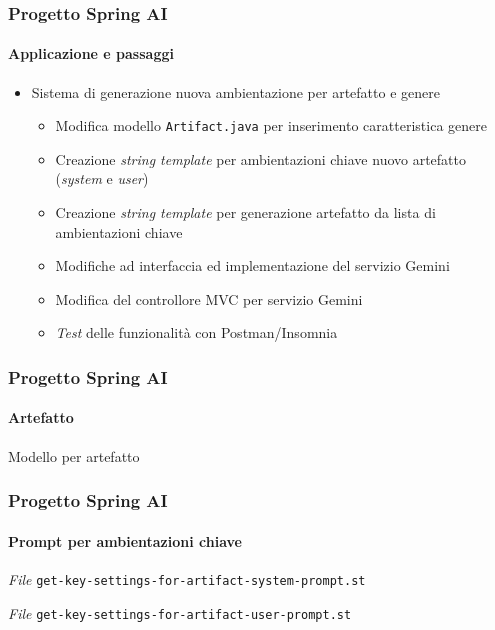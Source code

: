 %
\begin{frame}[t,fragile] \frametitle{Progetto Spring AI}
    \framesubtitle{Applicazione e passaggi}
    {\small
        \begin{itemize}[leftmargin=10pt,align=right]
            \item[\alert{\faArrowCircleRight}] Sistema di generazione nuova ambientazione per artefatto e genere
            \begin{itemize}[leftmargin=10pt,align=right]
                \item[\alertedcircled{1}] Modifica modello \texttt{Artifact.java} per inserimento caratteristica genere
                \item[\alertedcircled{2}] Creazione \textit{string template} per ambientazioni chiave nuovo artefatto (\textit{system} e \textit{user})
                \item[\alertedcircled{3}] Creazione \textit{string template} per generazione artefatto da lista di ambientazioni chiave
                \item[\alertedcircled{4}] Modifiche ad interfaccia ed implementazione del servizio Gemini
                \item[\alertedcircled{5}] Modifica del controllore MVC per servizio Gemini
                \item[\alertedcircled{6}] \textit{Test} delle funzionalità con Postman/Insomnia 
            \end{itemize}
        \end{itemize}
    }
\end{frame}
%
\begin{frame}[t,fragile] \frametitle{Progetto Spring AI}
    \framesubtitle{Artefatto}
        \begin{block}{Modello per artefatto}
			{\tiny}
    	\end{block}
\end{frame}
%
\begin{frame}[t,fragile] \frametitle{Progetto Spring AI}
    \framesubtitle{Prompt per ambientazioni chiave}
        \begin{block}{\textit{File} \texttt{get-key-settings-for-artifact-system-prompt.st}}
			{\scriptsize}
    	\end{block}
        \vspace*{.3cm}
        \begin{block}{\textit{File} \texttt{get-key-settings-for-artifact-user-prompt.st}}
			{\scriptsize}
    	\end{block}
\end{frame}
